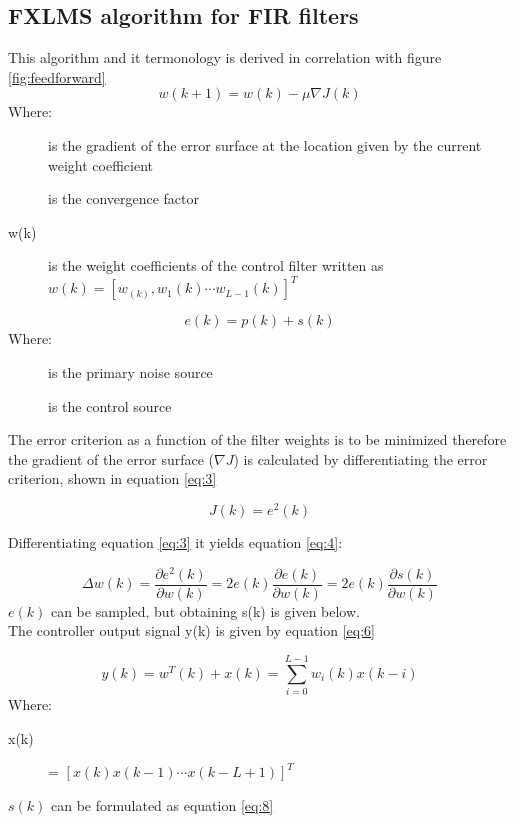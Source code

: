 \subsection*{FXLMS algorithm for FIR filters}\label{subsec:fxlms}

This algorithm and it termonology is derived in correlation with figure \ref{fig:feedforward}
\begin{equation}\label{eq:1}
w(k+1) = w(k) - \mu\nabla J(k)
\end{equation}
Where:
\begin{description}
	\item[] is the gradient of the error surface at the location given by the current weight coefficient
	\item[\text{$\mu$}] is the convergence factor
	\item[w(k)] is the weight coefficients of the control filter written as  $w(k)=[w_(k),w_1(k) \cdots w_{L-1}(k)]^T$
\end{description}

\begin{equation}\label{eq:2}
e(k) = p(k) + s(k)
\end{equation}
Where:
\begin{description}
	\item[] is the primary noise source
	\item[] is the control source
\end{description}

The error criterion as a function of the filter weights is to be minimized therefore the gradient of the error surface ($\nabla J$) is calculated by differentiating the error criterion, shown in equation \ref{eq:3} 

\begin{equation}\label{eq:3}
J(k) = e^2(k)
\end{equation}

Differentiating equation \ref{eq:3} it yields equation \ref{eq:4}:

\begin{equation}\label{eq:4}
\Delta w(k) = \frac{\partial e^2(k)}{\partial w(k)} = 2e(k)\frac{\partial e(k)}{\partial w(k)} = 2e(k)\frac{\partial s(k)}{\partial w(k)}
\end{equation}
$e(k)$ can be sampled, but obtaining s(k) is given below. \\
The controller output signal y(k) is given by equation \ref{eq:6} 

\begin{equation}\label{eq:6}
y(k) = w^T(k) + x(k) = \sum_{i=0}^{L-1} w_i(k)x(k-i)
\end{equation}
Where:
\begin{description}
	\item[x(k)] = $[x(k) x(k-1) \cdots x(k-L+1)]^T $
\end{description}
$s(k)$ can be formulated as equation \ref{eq:8}

